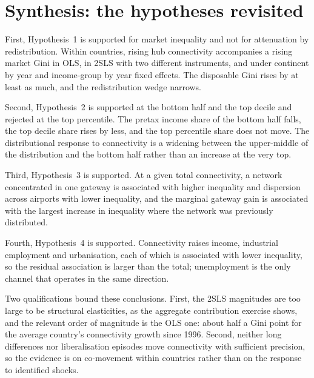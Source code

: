 \documentclass[12pt]{article}
\begin{document}
\section{Synthesis: the hypotheses revisited}
\label{sec:synthesis}
First, Hypothesis~1 is supported for market inequality and not for attenuation by redistribution. Within countries, rising hub connectivity accompanies a rising market Gini in OLS, in 2SLS with two different instruments, and under continent by year and income-group by year fixed effects. The disposable Gini rises by at least as much, and the redistribution wedge narrows.

Second, Hypothesis~2 is supported at the bottom half and the top decile and rejected at the top percentile. The pretax income share of the bottom half falls, the top decile share rises by less, and the top percentile share does not move. The distributional response to connectivity is a widening between the upper-middle of the distribution and the bottom half rather than an increase at the very top.

Third, Hypothesis~3 is supported. At a given total connectivity, a network concentrated in one gateway is associated with higher inequality and dispersion across airports with lower inequality, and the marginal gateway gain is associated with the largest increase in inequality where the network was previously distributed.

Fourth, Hypothesis~4 is supported. Connectivity raises income, industrial employment and urbanisation, each of which is associated with lower inequality, so the residual association is larger than the total; unemployment is the only channel that operates in the same direction.

Two qualifications bound these conclusions. First, the 2SLS magnitudes are too large to be structural elasticities, as the aggregate contribution exercise shows, and the relevant order of magnitude is the OLS one: about half a Gini point for the average country's connectivity growth since 1996. Second, neither long differences nor liberalisation episodes move connectivity with sufficient precision, so the evidence is on co-movement within countries rather than on the response to identified shocks.
\end{document}

